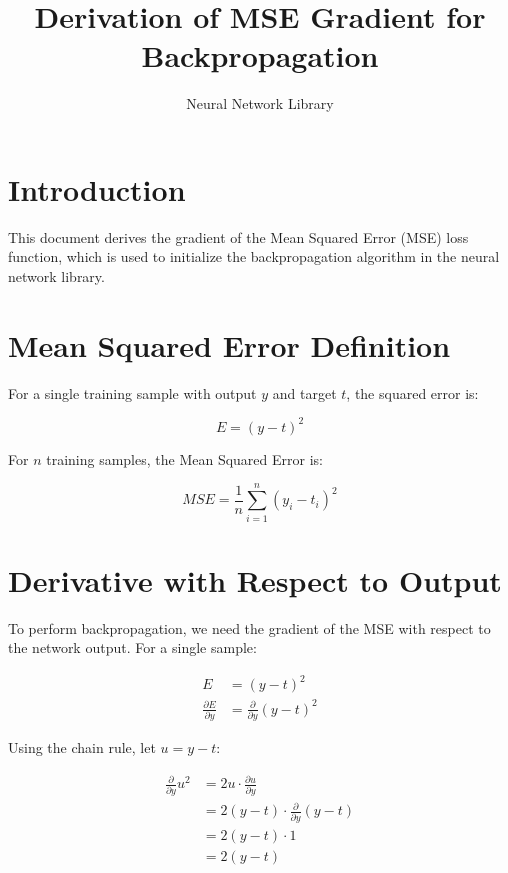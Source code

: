 \documentclass[12pt,a4paper]{article}
\title{Derivation of MSE Gradient for Backpropagation}
\author{Neural Network Library}
\date{}
\begin{document}
\maketitle

\section{Introduction}

This document derives the gradient of the Mean Squared Error (MSE) loss function, which is used to initialize the backpropagation algorithm in the neural network library.

\section{Mean Squared Error Definition}

For a single training sample with output $y$ and target $t$, the squared error is:

\begin{equation}
E = (y - t)^2
\end{equation}

For $n$ training samples, the Mean Squared Error is:

\begin{equation}
MSE = \frac{1}{n} \sum_{i=1}^{n} (y_i - t_i)^2
\end{equation}

\section{Derivative with Respect to Output}

To perform backpropagation, we need the gradient of the MSE with respect to the network output. For a single sample:

\begin{align}
E &= (y - t)^2 \\
\frac{\partial E}{\partial y} &= \frac{\partial}{\partial y} (y - t)^2
\end{align}

Using the chain rule, let $u = y - t$:

\begin{align}
\frac{\partial}{\partial y} u^2 &= 2u \cdot \frac{\partial u}{\partial y} \\
&= 2(y - t) \cdot \frac{\partial}{\partial y}(y - t) \\
&= 2(y - t) \cdot 1 \\
&= 2(y - t)
\end{align}
\end{document}
